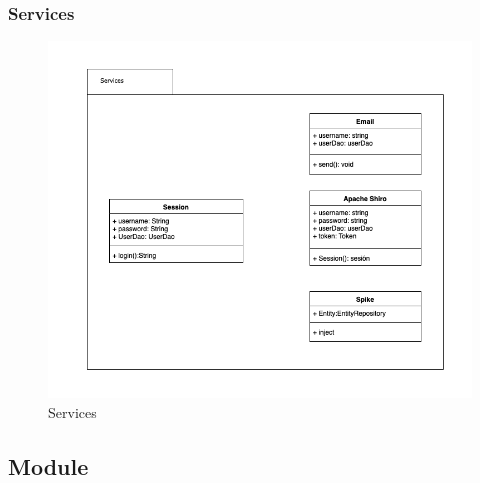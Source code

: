 \documentclass[enabledeprecatedfontcommands,fontsize=12pt,paper=a4,twoside]{scrartcl}
\begin{document}
\subsubsection{Services}
\begin{figure}[H]
\begin{center}
 \includegraphics[width=\textwidth]{UML/services.png}
  \caption{Services}
  \label{fig:boat1}
\end{center}
\end{figure}



\subsection{Module}
\end{document}
